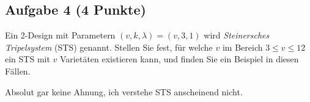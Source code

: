 \documentclass{article} %
\begin{document}
\subsection*{Aufgabe 4 (4 Punkte)}
Ein 2-Design mit Parametern \( (v, k, \lambda) = (v, 3, 1) \) wird \emph{Steinersches Tripelsystem} (STS) genannt.
Stellen Sie fest, für welche \( v \) im Bereich \( 3 \leq v \leq 12 \) ein STS mit \( v \) Varietäten
existieren kann, und finden Sie ein Beispiel in diesen Fällen.
\begin{mybox}
Absolut gar keine Ahnung, ich verstehe STS anscheinend nicht. 
\end{mybox}
\end{document}
